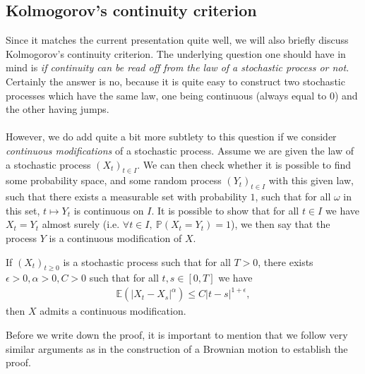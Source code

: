 \documentclass[../mainfile.tex]{subfiles}
\begin{document}
\subsection{Kolmogorov's continuity criterion}
Since it matches the current presentation quite well, we will also briefly discuss Kolmogorov's continuity criterion. The underlying question one should have in mind is \textit{if continuity can be read off from the law of a stochastic process or not}. Certainly the answer is no, because it is quite easy to construct two stochastic processes which have the same law, one being continuous (always equal to $0$) and the other having jumps.\\
\\
However, we do add quite a bit more subtlety to this question if we consider \textit{continuous modifications} of a stochastic process. Assume we are given the law of a stochastic process $(X_t)_{t \in I}$. We can then check whether it is possible to find some probability space, and some random process $(Y_t)_{t \in I}$ with this given law, such that there exists a measurable set with probability $1$, such that for all $\omega$ in this set, $t \mapsto Y_t$ is continuous on $I$. It is possible to show that for all $t \in I$ we have $X_t=Y_t$ almost surely (i.e. $\forall t \in I, \ \mathbb{P}(X_t=Y_t)=1$), we then say that the process $Y$ is a continuous modification of $X$. 
\begin{thm} If $(X_t)_{t \geq 0}$ is a stochastic process such that for all $T >0$, there exists $\epsilon >0, \alpha >0, C>0$ such that for all $t,s \in [0,T]$ we have 
\begin{align*}
\mathbb{E}(|X_t-X_s|^\alpha) \leq C|t-s|^{1 + \epsilon}, \tag{$\varsigma$}
\end{align*}
then $X$ admits a continuous modification. 
\end{thm}
\begin{rem} Before we write down the proof, it is important to mention that we follow very similar arguments as in the construction of a Brownian motion to establish the proof. 
\end{rem}
\end{document}
